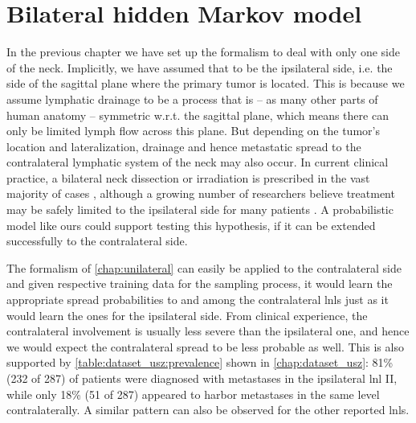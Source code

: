 \documentclass[\relativeRoot/main.tex]{subfiles}
\begin{document}
\chapter{Bilateral hidden Markov model}
\label{chap:bilateral}

In the previous chapter we have set up the formalism to deal with only one side of the neck. Implicitly, we have assumed that to be the ipsilateral side, i.e. the side of the sagittal plane where the primary tumor is located. This is because we assume lymphatic drainage to be a process that is -- as many other parts of human anatomy -- symmetric w.r.t. the sagittal plane, which means there can only be limited lymph flow across this plane. But depending on the tumor's location and lateralization, drainage and hence metastatic spread to the contralateral lymphatic system of the neck may also occur. In current clinical practice, a bilateral neck dissection or irradiation is prescribed in the vast majority of cases \cite{de_veij_mestdagh_incidence_2019}, although a growing number of researchers believe treatment may be safely limited to the ipsilateral side for many patients \cite{rackley_unilateral_2017,de_veij_mestdagh_spectct-guided_2020}. A probabilistic model like ours could support testing this hypothesis, if it can be extended successfully to the contralateral side.

The formalism of \cref{chap:unilateral} can easily be applied to the contralateral side and given respective training data for the sampling process, it would learn the appropriate spread probabilities to and among the contralateral \glspl{lnl} just as it would learn the ones for the ipsilateral side. From clinical experience, the contralateral involvement is usually less severe than the ipsilateral one, and hence we would expect the contralateral spread to be less probable as well. This is also supported by \cref{table:dataset_usz:prevalence} shown in \cref{chap:dataset_usz}: 81\% (232 of 287) of patients were diagnosed with metastases in the ipsilateral \gls{lnl} II, while only 18\% (51 of 287) appeared to harbor metastases in the same level contralaterally. A similar pattern can also be observed for the other reported \glspl{lnl}.
\end{document}
